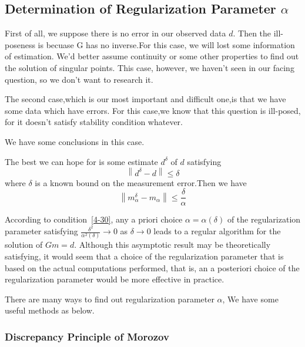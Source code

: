 \documentclass[a4paper]{article}
\begin{document}
\subsection{Determination of Regularization Parameter $\alpha$ }

First of all, we suppose there is no error in our observed data $d$. Then the
ill-poseness is becuase G has no inverse.For this case, we will lost some
information of estimation. We'd better assume continuity or some other
properties to find out the solution of singular points. This case, however, we
haven't seen in our facing question, so we don't want to research it.\\
\par
The second case,which is our most important and difficult one,is that we have
some data which have errors. For this case,we know that this question is
ill-posed, for it doesn't satisfy stability condition whatever.
\par
We have some conclusions in this case.

The best we can hope for is some estimate $d^{\delta}$ of $d$ satisfying
\begin{equation}
  \left\| d^{\delta} - d \right\| \leqslant \delta
\end{equation}
where $\delta$ is a known bound on the measurement error.Then we have
\begin{equation}
  \left\| m_{\alpha}^{\delta} - m_{\alpha} \right\| \leqslant
  \frac{\delta}{\alpha}
  \label{4-30}
\end{equation}


According to condition~\ref{4-30}, any a priori choice $\alpha = \alpha (\delta)$ of
the regularization parameter satisfying $\frac{\delta^2}{\alpha^2 \left(
\delta \right)} \longrightarrow 0$ as $\delta \longrightarrow 0$ leads to a
regular algorithm for the solution of $G m = d$. Although this asymptotic
result may be theoretically satisfying, it would seem that a choice of the
regularization parameter that is based on the actual computations performed,
that is, an a posteriori choice of the regularization parameter would be more
effective in practice.
\par
There are many ways to find out regularization parameter $\alpha$, We
have some useful methods as below.


\subsubsection{Discrepancy Principle of Morozov}
\end{document}
